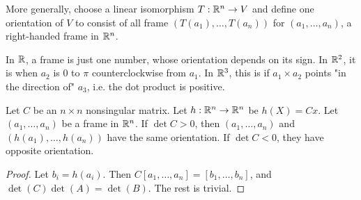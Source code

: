 \documentclass[12pt]{article}
\begin{document}
More generally, choose a linear isomorphism $T:\mathbb{R}^n \rightarrow V$ and define one orientation of $V$ to consist of all frame $(T(a_1), \dots, T(a_n))$ for $(a_1,\dots,a_n)$, a right-handed frame in $\mathbb{R}^n$.

\begin{ex}
    In $\mathbb{R}$, a frame is just one number, whose orientation depends on its sign. In $\mathbb{R}^2$, it is when $a_2$ is $0$ to $\pi$ counterclockwise from $a_1$. In $\mathbb{R}^3$, this is if $a_1 \times a_2$ points "in the direction of" $a_3$, i.e. the dot product is positive.
\end{ex}

\begin{thm}
    Let $C$ be an $n\times n$ nonsingular matrix. Let $h: \mathbb{R}^n \rightarrow \mathbb{R}^n$ be $h(X) = Cx$. Let $(a_1, \dots, a_n)$ be a frame in $\mathbb{R}^n$. If $\det C > 0$, then $(a_1, \dots, a_n)$ and $(h(a_1), \dots, h(a_n))$ have the same orientation. If $\det C < 0$, they have opposite orientation.
\end{thm}

\begin{proof}
    Let $b_i = h(a_i)$. Then $C[a_1, \dots, a_n] = [b_1, \dots, b_n]$, and $\det(C)\det(A) = \det(B)$. The rest is trivial.
\end{proof}
\end{document}
